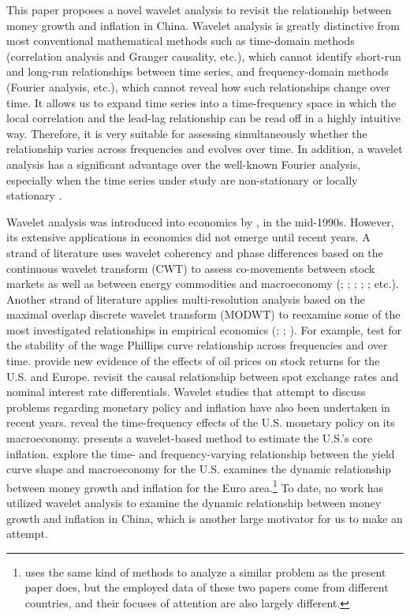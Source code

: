 \documentclass[a4paper,fleqn]{cas-sc}
\begin{document}
This paper proposes a novel wavelet analysis to revisit the relationship between money growth and inflation in China. Wavelet analysis is greatly distinctive from most conventional mathematical methods such as time-domain methods (correlation analysis and Granger causality, etc.), which cannot identify short-run and long-run relationships between time series, and frequency-domain methods (Fourier analysis, etc.), which cannot reveal how such relationships change over time. It allows us to expand time series into a time-frequency space in which the local correlation and the lead-lag relationship can be read off in a highly intuitive way. Therefore, it is very suitable for assessing simultaneously whether the relationship varies across frequencies and evolves over time. In addition, a wavelet analysis has a significant advantage over the well-known Fourier analysis, especially when the time series under study are non-stationary or locally stationary \cite{ROUEFF2011813}.

Wavelet analysis was introduced into economics by \cite{Goffe1994}, \cite{ramsey1998decomposition,ramseylampart1998} in the mid-1990s. However, its extensive applications in economics did not emerge until recent years. A strand of literature uses wavelet coherency and phase differences based on the continuous wavelet transform (CWT) to assess co-movements between stock markets as well as between energy commodities and macroeconomy (\cite{RUA2009}; \cite{grahanikkinen2011}; \cite{Aguiar-Conraria2011}; \cite{maccarthyOrlov2012}; \cite{VACHA2012}; etc.). Another strand of literature applies multi-resolution analysis based on the maximal overlap discrete wavelet transform (MODWT) to reexamine some of the most investigated relationships in empirical economics (\cite*{GALLEGATI2011}; \cite*{HACKER2014}; \cite{REBOREDO2014}). For example, \cite{GALLEGATI2011} test for the stability of the wage Phillips curve relationship across frequencies and over time. \cite{REBOREDO2014} provide new evidence of the effects of oil prices on stock returns for the U.S. and Europe. \cite{HACKER2014} revisit the causal relationship between spot exchange rates and nominal interest rate differentials. Wavelet studies that attempt to discuss problems regarding monetary policy and inflation have also been undertaken in recent years. \cite*{AGUIARCONRARIA2008} reveal the time-frequency effects of the U.S. monetary policy on its macroeconomy. \cite*{dowd2011} presents a wavelet-based method to estimate the U.S.'s core inflation. \cite*{AGUIAR2012} explore the time- and frequency-varying relationship between the yield curve shape and macroeconomy for the U.S. \cite{Rua2012} examines the dynamic relationship between money growth and inflation for the Euro area.\footnote{\cite{Rua2012} uses the same kind of methods to analyze a similar problem as the present paper does, but the employed data of these two papers come from different countries, and their focuses of attention are also largely different.} To date, no work has utilized wavelet analysis to examine the dynamic relationship between money growth and inflation in China, which is another large motivator for us to make an attempt.
\end{document}
